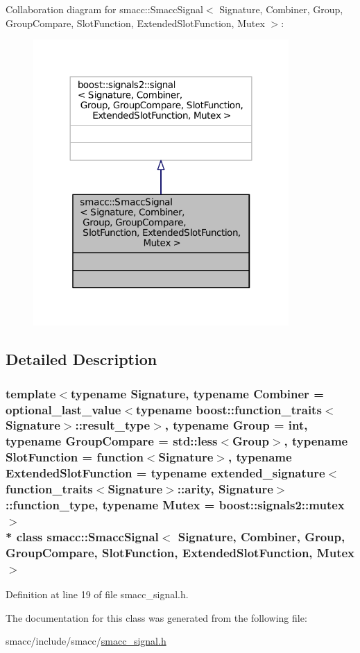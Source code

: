 Collaboration diagram for smacc\+:\+:Smacc\+Signal$<$ Signature, Combiner, Group, Group\+Compare, Slot\+Function, Extended\+Slot\+Function, Mutex $>$\+:
\nopagebreak
\begin{figure}[H]
\begin{center}
\leavevmode
\includegraphics[width=276pt]{classsmacc_1_1SmaccSignal__coll__graph}
\end{center}
\end{figure}


\subsection{Detailed Description}
\subsubsection*{template$<$typename Signature, typename Combiner = optional\+\_\+last\+\_\+value$<$typename boost\+::function\+\_\+traits$<$\+Signature$>$\+::result\+\_\+type$>$, typename Group = int, typename Group\+Compare = std\+::less$<$\+Group$>$, typename Slot\+Function = function$<$\+Signature$>$, typename Extended\+Slot\+Function = typename extended\+\_\+signature$<$function\+\_\+traits$<$\+Signature$>$\+::arity, Signature$>$\+::function\+\_\+type, typename Mutex = boost\+::signals2\+::mutex$>$\\*
class smacc\+::\+Smacc\+Signal$<$ Signature, Combiner, Group, Group\+Compare, Slot\+Function, Extended\+Slot\+Function, Mutex $>$}



Definition at line 19 of file smacc\+\_\+signal.\+h.



The documentation for this class was generated from the following file\+:\begin{DoxyCompactItemize}
\item 
smacc/include/smacc/\hyperlink{smacc__signal_8h}{smacc\+\_\+signal.\+h}\end{DoxyCompactItemize}
